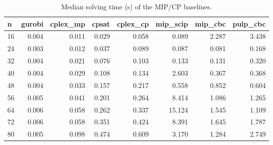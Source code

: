 \begin{table}[t]
\centering
\caption{Median solving time (s) of the MIP/CP baselines.}
\label{tab:baseline}
\begin{tabular}{lrrrrrrr}
\toprule
n & gurobi & cplex\_mp & cpsat & cplex\_cp & mip\_scip & mip\_cbc & pulp\_cbc \\
\midrule
16 & 0.004 & 0.011 & 0.029 & 0.058 & 0.089 & 2.287 & 3.438 \\
24 & 0.003 & 0.012 & 0.037 & 0.089 & 0.087 & 0.081 & 0.168 \\
32 & 0.004 & 0.021 & 0.076 & 0.103 & 0.133 & 0.131 & 0.320 \\
40 & 0.004 & 0.029 & 0.108 & 0.134 & 2.603 & 0.367 & 0.368 \\
48 & 0.004 & 0.033 & 0.157 & 0.217 & 0.558 & 0.852 & 0.604 \\
56 & 0.005 & 0.041 & 0.201 & 0.264 & 8.414 & 1.086 & 1.265 \\
64 & 0.006 & 0.058 & 0.262 & 0.337 & 15.124 & 1.545 & 1.109 \\
72 & 0.006 & 0.058 & 0.351 & 0.424 & 8.391 & 1.645 & 1.787 \\
80 & 0.005 & 0.098 & 0.474 & 0.609 & 3.170 & 1.284 & 2.749 \\
\bottomrule
\end{tabular}
\end{table}
